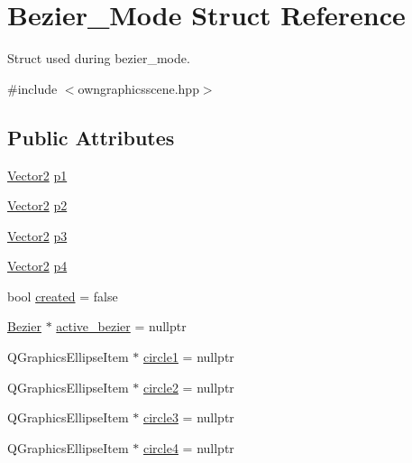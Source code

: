 \hypertarget{structBezier__Mode}{}\section{Bezier\+\_\+\+Mode Struct Reference}
\label{structBezier__Mode}


Struct used during bezier\+\_\+mode.  




{\ttfamily \#include $<$owngraphicsscene.\+hpp$>$}

\subsection*{Public Attributes}
\begin{DoxyCompactItemize}
\item 
\mbox{\hyperlink{classVector2}{Vector2}} \mbox{\hyperlink{structBezier__Mode_a2d7c5ccccb03114fd1b26a20843a59e4}{p1}}
\item 
\mbox{\hyperlink{classVector2}{Vector2}} \mbox{\hyperlink{structBezier__Mode_a96ed0f4076e540e5a8789f25f9bf65e9}{p2}}
\item 
\mbox{\hyperlink{classVector2}{Vector2}} \mbox{\hyperlink{structBezier__Mode_ad9fbff84a5248923ceb29433dc58f49b}{p3}}
\item 
\mbox{\hyperlink{classVector2}{Vector2}} \mbox{\hyperlink{structBezier__Mode_a5a3df46137ba62eaf3f9c0ad1ee391ef}{p4}}
\item 
bool \mbox{\hyperlink{structBezier__Mode_ae2573f8601e7d9f439d2bfbc11c34ae9}{created}} = false
\item 
\mbox{\hyperlink{classBezier}{Bezier}} $\ast$ \mbox{\hyperlink{structBezier__Mode_a9aefbd869ef59854732e405886d334fb}{active\+\_\+bezier}} = nullptr
\item 
Q\+Graphics\+Ellipse\+Item $\ast$ \mbox{\hyperlink{structBezier__Mode_ab07833315488dc0d3c6f613c51de1d3f}{circle1}} = nullptr
\item 
Q\+Graphics\+Ellipse\+Item $\ast$ \mbox{\hyperlink{structBezier__Mode_a3f6f2bdade3db15c0855820d86a5b98e}{circle2}} = nullptr
\item 
Q\+Graphics\+Ellipse\+Item $\ast$ \mbox{\hyperlink{structBezier__Mode_a342d3b970c6049b615ef356a902c0781}{circle3}} = nullptr
\item 
Q\+Graphics\+Ellipse\+Item $\ast$ \mbox{\hyperlink{structBezier__Mode_a6f26e1fe7da425063b792dab9f3c1099}{circle4}} = nullptr
\end{DoxyCompactItemize}


